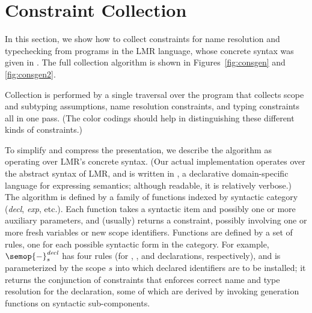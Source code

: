 \section{Constraint Collection}

\newcommand{\kind}[1]{\footnotesize{\mbox{\it{#1}}}}

\newcommand{\sema}[3]{
\semop{#2}^{\mathit{#1}}_{#3}
}

\newcommand{\fresh}[1]{\mbox{\it(fresh ${#1}$)}} 
\newcommand{\new}[1]{\mbox{\it(new ${#1}$)}} 

\newcommand{\cand}{\ \wedge\ }  %

\newcommand{\inttysub}{\footnotesize \intty}
\newcommand{\arrtysub}[2]{\footnotesize {\arrty{#1}{#2}}}
\newcommand{\rectysub}[1]{\footnotesize {\recty{#1}}}

In this section, we show how to collect constraints for name resolution and
typechecking from programs in the LMR language, whose concrete syntax was
given in .
The full collection algorithm is shown in Figures~\ref{fig:consgen} and \ref{fig:consgen2}.  


Collection is performed by a single traversal over 
the program that collects scope and subtyping assumptions, name resolution 
constraints, and typing constraints all in one pass. (The color codings 
should help in distinguishing these different kinds of constraints.)

To simplify and compress the presentation, we describe the algorithm as operating over LMR's
concrete syntax. (Our actual implementation operates over the abstract
syntax of LMR, and is written in \DynSem{}, a declarative domain-specific 
language for expressing semantics; although readable, it is relatively verbose.)
The algorithm is defined by a family of functions indexed by
syntactic category ({\it decl}, {\it exp}, etc.). Each function takes a syntactic item and
possibly one or more auxiliary parameters, and (usually) 
returns a constraint, possibly involving one or more fresh variables or new
scope identifiers.  Functions are defined by a set of rules, one for each possible syntactic form
in the category. For example, $\sema{decl}{-}{s}$ has four rules (for , , 
and  declarations, respectively), and is parameterized by
the scope $s$ into which declared identifiers are to be installed; it returns the 
conjunction of constraints that enforces correct name and type resolution for the declaration, 
some of which are derived by invoking generation functions on syntactic sub-components.

